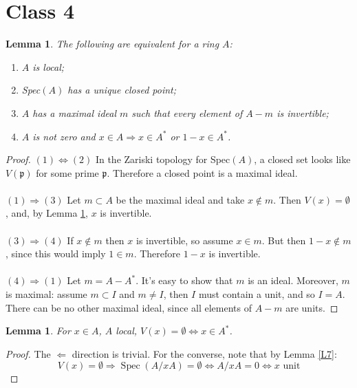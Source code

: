 \documentclass{article}
\newcommand{\fr}{\mathfrak}
\DeclareMathOperator{\Spec}{Spec}
\theoremstyle{plain}
\newtheorem{lem}[thm]{Lemma}
\theoremstyle{definition}
\theoremstyle{remark}
\begin{document}
\section*{Class 4}

\begin{lem}
\label{L18}
The following are equivalent for a ring $A$:
\begin{enumerate}[(1)]
\item $A$ is local;
\item Spec$(A)$ has a unique closed point;
\item $A$ has a maximal ideal $m$ such that every element of $A-m$ is invertible;
\item $A$ is not zero and $x\in A \Rightarrow x\in A^*$ or $1-x \in A^*$.
\end{enumerate}
\end{lem}

\begin{proof}
$(1) \Leftrightarrow (2)$ In the Zariski topology for Spec$(A)$, a closed set looks like $V(\fr p)$ for some prime $\fr p$. Therefore a closed point is a maximal ideal.
\\
\\
$(1) \Rightarrow (3)$ Let $m\subset A$ be the maximal ideal and take $x\not \in m$. Then $V(x) = \emptyset$, and, by Lemma \ref{L19}, $x$ is invertible.
\\
\\
$(3) \Rightarrow (4)$ If $x\not \in m$ then $x$ is invertible, so assume $x\in m$. But then $1-x \not \in m$, since this would imply $1\in m$. Therefore $1-x$ is invertible.
\\
\\
$(4) \Rightarrow (1)$ Let $m = A - A^*$. It's easy to show that $m$ is an ideal. Moreover, $m$ is maximal: assume $m\subset I$ and $m\neq I$, then $I$ must contain a unit, and so $I = A$. There can be no other maximal ideal, since all elements of $A-m$ are units.
\end{proof}


\begin{lem}
\label{L19}
For $x\in A$, $A$ local, $V(x) = \emptyset \Leftrightarrow x\in A^*$.
\end{lem}
\begin{proof}
The $\Leftarrow$ direction is trivial. For the converse, note that by Lemma \ref{L7}:
\[ V(x) = \emptyset \Rightarrow \Spec(A/xA) = \emptyset \Leftrightarrow A/xA = 0 \Leftrightarrow x \text{ unit} \]
\end{proof}
\end{document}
